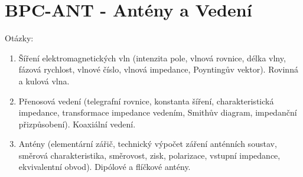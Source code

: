 
%

%

\graphicspath{{./Obrazky/}}
\part{BPC-ANT - Antény a Vedení}
{\huge
Otázky:}
\begin{enumerate}
	\item Šíření elektromagnetických vln (intenzita pole, vlnová rovnice, délka vlny, fázová rychlost, vlnové číslo, vlnová impedance, Poyntingův vektor). Rovinná a kulová vlna.
	\item Přenosová vedení (telegrafní rovnice, konstanta šíření, charakteristická impedance, transformace impedance vedením, Smithův diagram, impedanční přizpůsobení). Koaxiální vedení.
	\item Antény (elementární zářič, technický výpočet záření anténních soustav, směrová charakteristika, směrovost, zisk, polarizace, vstupní impedance, ekvivalentní obvod). Dipólové a flíčkové antény.
\end{enumerate}

